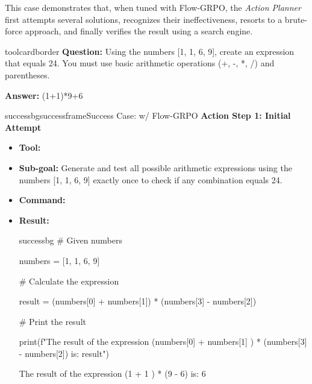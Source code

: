 This case demonstrates that, when tuned with Flow-GRPO, the \textit{Action Planner} first attempts several solutions, recognizes their ineffectiveness, resorts to a brute-force approach, and finally verifies the result using a search engine.

\begin{custombox}[title=Example from \# GameOf24]{toolcardborder}
\textbf{Question:} Using the numbers [1, 1, 6, 9], create an expression that equals 24. You must use basic arithmetic operations (+, -, *, /) and parentheses.

\vspace{1em}

\textbf{Answer:} (1+1)*9+6
\end{custombox}

\begin{small}
\begin{center}

\begin{casebox}{successbg}{successframe}{Success Case: \model w/ Flow-GRPO}
    \textbf{Action Step 1: Initial Attempt}
    \begin{itemize}[nosep, leftmargin=*]
        \item \textbf{Tool:} 
        \item \textbf{Sub-goal:} Generate and test all possible arithmetic expressions using the numbers [1, 1, 6, 9] exactly once to check if any combination equals 24.
        \item \textbf{Command:} 
        
        \item \textbf{Result:}
        \begin{casecode}{successbg}
\# Given numbers

numbers = [1, 1, 6, 9]

\# Calculate the expression

result = (numbers[0] + numbers[1]) * (numbers[3] - numbers[2])

\# Print the result

print(f"The result of the expression ({numbers[0]} + {numbers[1]} ) * ({numbers[3]} - {numbers[2]}) is: {result}")
        \end{casecode}
        The result of the expression (1 + 1 ) * (9 - 6) is: 6
    \end{itemize}


\end{casebox}
\end{center}
\end{small}
